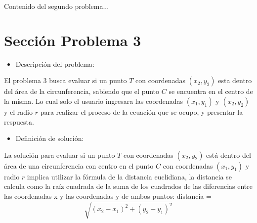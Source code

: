 \documentclass{IEEEcsmag}
\begin{document}
\newpage
Contenido del segundo problema...
\newpage








































































\section{Sección Problema 3}

\begin{itemize}
    \item Descripción del problema:
\end{itemize}
\begin{enumerate}
El problema 3 busca evaluar si un punto $T$ con coordenadas $(x_{2}, y_{2})$ esta dentro del área de la circunferencia, sabiendo que el punto $C$ se encuentra en el centro de la misma. Lo cual solo el usuario ingresara las coordenadas $(x_{1}, y_{1})$ y $(x_{2}, y_{2})$  y el radio $r$ para realizar el proceso de la  ecuación que se ocupo, y presentar la respuesta.
\end{enumerate}


\begin{itemize}
    \item Definición de solución:
\end{itemize} 
La solución para evaluar si un punto $T$ con coordenadas $(x_{2}, y_{2})$ está dentro del área de una circunferencia con centro en el punto $C$ con coordenadas $(x_{1}, y_{1})$ y radio $r$ implica utilizar la fórmula de la distancia euclidiana, la distancia se calcula como la raíz cuadrada de la suma de los cuadrados de las diferencias entre las coordenadas x y las coordenadas y de ambos puntos:
distancia = 
\begin{equation}
   \sqrt{ (x_2 - x_1)^2 + (y_2 - y_1)^2 }     
\end{equation}
\end{document}
